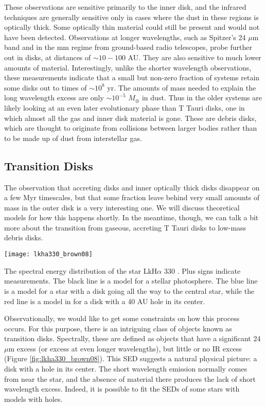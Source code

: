 These observations are sensitive primarily to the inner disk, and the infrared techniques are generally sensitive only in cases where the dust in these regions is optically thick. Some optically thin material could still be present and would not have been detected. Observations at longer wavelengths, such as Spitzer's 24 $\mu$m band and in the mm regime from ground-based radio telescopes, probe further out in disks, at distances of $\sim 10-100$ AU. They are also sensitive to much lower amounts of material. Interestingly, unlike the shorter wavelength observations, these measurements indicate that a small but non-zero fraction of systems retain some disks out to times of $\sim 10^8$ yr. The amounts of mass needed to explain the long wavelength excess are only $\sim 10^{-5}$ $M_{\oplus}$ in dust. Thus in the older systems are likely looking at an even later evolutionary phase than T Tauri disks, one in which almost all the gas and inner disk material is gone. These are debris disks, which are thought to originate from collisions between larger bodies rather than to be made up of dust from interstellar gas.

\subsection{Transition Disks}

The observation that accreting disks and inner optically thick disks disappear on a few Myr timescales, but that some fraction leave behind very small amounts of mass in the outer disk is a very interesting one. We will discuss theoretical models for how this happens shortly. In the meantime, though, we can talk a bit more about the transition from gaseous, accreting T Tauri disks to low-mass debris disks.

\begin{marginfigure}
\texttt{[image: lkha330\_brown08]}
\caption[Spectral energy distribution of LkH$\alpha$ 330]{
\label{fig:lkha330_brown08}
The spectral energy distribution of the star LkH$\alpha$ 330 \citep{brown08a}. Plus signs indicate measurements. The black line is a model for a stellar photosphere. The blue line is a model for a star with a disk going all the way to the central star, while the red line is a model in for a disk with a 40 AU hole in its center.
}
\end{marginfigure}

Observationally, we would like to get some constraints on how this process occurs. For this purpose, there is an intriguing class of objects known as transition disks. Spectrally, these are defined as objects that have a significant 24 $\mu$m excess (or excess at even longer wavelengths), but little or no IR excess (Figure \ref{fig:lkha330_brown08}). This SED suggests a natural physical picture: a disk with a hole in its center. The short wavelength emission normally comes from near the star, and the absence of material there produces the lack of short wavelength excess. Indeed, it is possible to fit the SEDs of some stars with models with holes.

